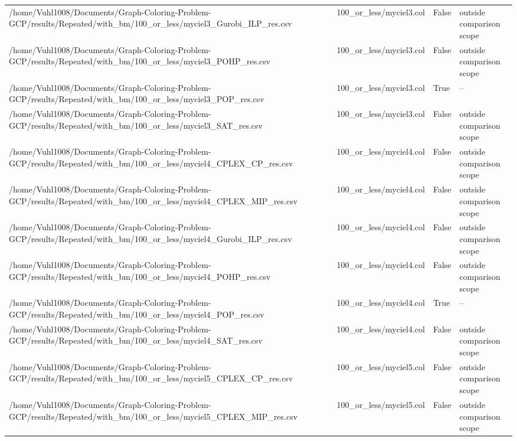 \begin{table}[htbp]
\begin{tabular}{llll}
/home/Vuhl1008/Documents/Graph-Coloring-Problem-GCP/results/Repeated/with\_bm/100\_or\_less/myciel3\_Gurobi\_ILP\_res.csv & 100\_or\_less/myciel3.col & False & outside comparison scope \\
/home/Vuhl1008/Documents/Graph-Coloring-Problem-GCP/results/Repeated/with\_bm/100\_or\_less/myciel3\_POHP\_res.csv & 100\_or\_less/myciel3.col & False & outside comparison scope \\
/home/Vuhl1008/Documents/Graph-Coloring-Problem-GCP/results/Repeated/with\_bm/100\_or\_less/myciel3\_POP\_res.csv & 100\_or\_less/myciel3.col & True & -- \\
/home/Vuhl1008/Documents/Graph-Coloring-Problem-GCP/results/Repeated/with\_bm/100\_or\_less/myciel3\_SAT\_res.csv & 100\_or\_less/myciel3.col & False & outside comparison scope \\
/home/Vuhl1008/Documents/Graph-Coloring-Problem-GCP/results/Repeated/with\_bm/100\_or\_less/myciel4\_CPLEX\_CP\_res.csv & 100\_or\_less/myciel4.col & False & outside comparison scope \\
/home/Vuhl1008/Documents/Graph-Coloring-Problem-GCP/results/Repeated/with\_bm/100\_or\_less/myciel4\_CPLEX\_MIP\_res.csv & 100\_or\_less/myciel4.col & False & outside comparison scope \\
/home/Vuhl1008/Documents/Graph-Coloring-Problem-GCP/results/Repeated/with\_bm/100\_or\_less/myciel4\_Gurobi\_ILP\_res.csv & 100\_or\_less/myciel4.col & False & outside comparison scope \\
/home/Vuhl1008/Documents/Graph-Coloring-Problem-GCP/results/Repeated/with\_bm/100\_or\_less/myciel4\_POHP\_res.csv & 100\_or\_less/myciel4.col & False & outside comparison scope \\
/home/Vuhl1008/Documents/Graph-Coloring-Problem-GCP/results/Repeated/with\_bm/100\_or\_less/myciel4\_POP\_res.csv & 100\_or\_less/myciel4.col & True & -- \\
/home/Vuhl1008/Documents/Graph-Coloring-Problem-GCP/results/Repeated/with\_bm/100\_or\_less/myciel4\_SAT\_res.csv & 100\_or\_less/myciel4.col & False & outside comparison scope \\
/home/Vuhl1008/Documents/Graph-Coloring-Problem-GCP/results/Repeated/with\_bm/100\_or\_less/myciel5\_CPLEX\_CP\_res.csv & 100\_or\_less/myciel5.col & False & outside comparison scope \\
/home/Vuhl1008/Documents/Graph-Coloring-Problem-GCP/results/Repeated/with\_bm/100\_or\_less/myciel5\_CPLEX\_MIP\_res.csv & 100\_or\_less/myciel5.col & False & outside comparison scope \\

\end{tabular}
\end{table}
